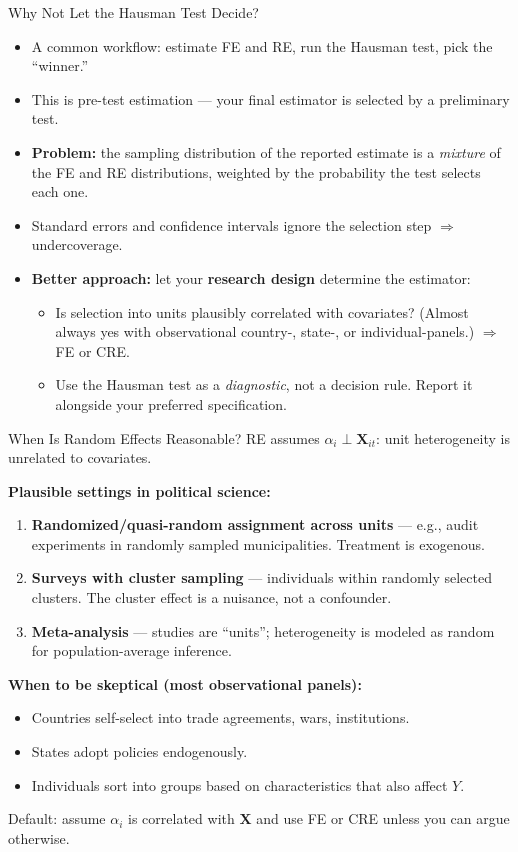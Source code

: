 \documentclass[aspectratio=169, handout, t]{beamer}
\numberwithin{equation}{section}
\begin{document}
\begin{frame}{Why Not Let the Hausman Test Decide?}
\begin{itemize}
\item A common workflow: estimate FE and RE, run the Hausman test, pick the ``winner.''
\item This is \alert{pre-test estimation} --- your final estimator is selected by a preliminary test.
\pause
\item \textbf{Problem:} the sampling distribution of the reported estimate is a \emph{mixture} of the FE and RE distributions, weighted by the probability the test selects each one.
\item Standard errors and confidence intervals ignore the selection step $\Rightarrow$ \alert{undercoverage}.
\pause
\item \textbf{Better approach:} let your \textbf{research design} determine the estimator:
\begin{itemize}
\item Is selection into units plausibly correlated with covariates? (Almost always yes with observational country-, state-, or individual-panels.) $\Rightarrow$ FE or CRE.
\item Use the Hausman test as a \emph{diagnostic}, not a decision rule. Report it alongside your preferred specification.
\end{itemize}
\end{itemize}
\end{frame}


\begin{frame}{When Is Random Effects Reasonable?}
RE assumes $\alpha_i \perp \bm{X}_{it}$: unit heterogeneity is unrelated to covariates.\pause
\smallskip

\textbf{Plausible settings in political science:}
\begin{enumerate}\itemsep=1pt
\item \textbf{Randomized/quasi-random assignment across units} --- e.g., audit experiments in randomly sampled municipalities. Treatment is exogenous.
\item \textbf{Surveys with cluster sampling} --- individuals within randomly selected clusters. The cluster effect is a nuisance, not a confounder.
\item \textbf{Meta-analysis} --- studies are ``units''; heterogeneity is modeled as random for population-average inference.
\end{enumerate}\pause
\smallskip

\textbf{When to be skeptical (most observational panels):}
\begin{itemize}\itemsep=1pt
\item Countries self-select into trade agreements, wars, institutions.
\item States adopt policies endogenously.
\item Individuals sort into groups based on characteristics that also affect $Y$.
\end{itemize}
\smallskip
\alert{Default:} assume $\alpha_i$ is correlated with $\bm{X}$ and use FE or CRE unless you can argue otherwise.
\end{frame}
\end{document}
